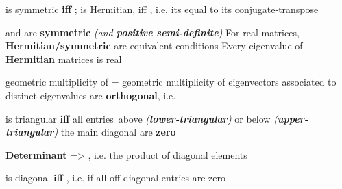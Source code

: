 \hSep %

 is symmetric \textbf{iff} ;  is Hermitian, iff , i.e. its equal
to its conjugate-transpose

\begin{itemize}

      \vItem
             and  are \textbf{symmetric} \emph{(and
                  \textbf{positive semi-definite})}
      \vItem
            For real matrices, \textbf{Hermitian/symmetric} are equivalent
            conditions
      \vItem
            Every eigenvalue  of \textbf{Hermitian} matrices
            is real

            \begin{itemize}

                  \vItem
                        geometric multiplicity of  = geometric multiplicity of 
                  \vItem
                        eigenvectors  associated
                        to distinct eigenvalues  are
                        \textbf{orthogonal},
                        i.e. 
            \end{itemize}
\end{itemize}

\hSep %

 is triangular \textbf{iff} all entries~above
\emph{(\textbf{lower-triangular})} or below
\emph{(\textbf{upper-triangular})} the main diagonal are \textbf{zero}

\begin{itemize}
      \vItem
            \textbf{Determinant} =>
            , i.e. the product of
            diagonal elements
\end{itemize}

\hSep %

 is diagonal \textbf{iff} ,
i.e. if all off-diagonal entries are zero

